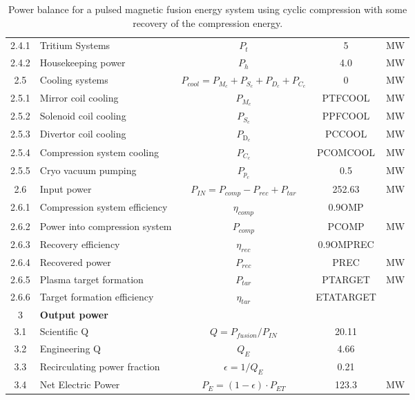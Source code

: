 \begin{table}[ht!]
\begin{tabular}{|c|p{5cm}|c|c|c|}
2.4.1	&	Tritium Systems	&	$P_{{t}}$	&	5	&	MW \\
2.4.2	&	Housekeeping power	&	$P_{{h}}$	&	4.0	&	MW \\
2.5	&	Cooling systems	&	$P_{cool} = P_{{M}_c} + P_{{S}_c} + P_{{D}_c}+ P_{{C}_c}$	&	0	&	MW \\
2.5.1	&	Mirror coil cooling	&	$P_{{M}_c}$	&	PTFCOOL	&	MW \\
2.5.2	&	Solenoid coil cooling	&	$P_{{S}_c}$	&	PPFCOOL	&	MW \\
2.5.3 & Divertor coil cooling & $P_{\text{D}_c}$ & PCCOOL & MW \\
2.5.4	&	Compression system cooling	&	$P_{{C}_c}$	&	PCOMCOOL	&	MW \\
2.5.5	&	Cryo vacuum pumping	&	$P_{{p}_c}$	&	0.5	&	MW \\
2.6	& Input power	& $P_{IN} = P_{comp}-P_{{rec}} + P_{tar}$	&	252.63	&	MW \\
2.6.1	&	Compression system efficiency	&	$\eta_{{comp}}$	&	0.9OMP	&	\\
2.6.2	&	Power into compression system	&	$P_{{comp}}$	&	PCOMP	&	MW \\
2.6.3	&	Recovery efficiency	&	$\eta_{{rec}}$	&	0.9OMPREC	&	 \\
2.6.4	&	Recovered power	&	$P_{{rec}}$	&	PREC	&	MW \\
2.6.5	&	Plasma target formation	&	$P_{{tar}}$	&	PTARGET	&	MW \\
2.6.6	&	Target formation efficiency	&	$\eta_{tar}$	&	ETATARGET	&	 \\

\hline								
3	&	\textbf{Output power}	&		&		&	\\
\hline
3.1	&	Scientific Q	&	$Q = P_{{fusion}}/P_{{IN}}$	&	20.11	&	\\
3.2	&	Engineering Q	&	$Q_{{E}}$	&	4.66	&	\\
3.3	&	Recirculating power fraction	&	$\epsilon = 1/Q_{{E}}$	&	0.21	&	\\
3.4	&	Net Electric Power	&	$P_{{E}} = (1 - \epsilon) \cdot P_{{ET}}$	&	123.3	&	MW \\
\hline								
\end{tabular}	
\caption{Power balance for a pulsed magnetic fusion energy system using cyclic compression with some recovery of the compression energy.}
\label{tab:powerbalance}
\end{table}



